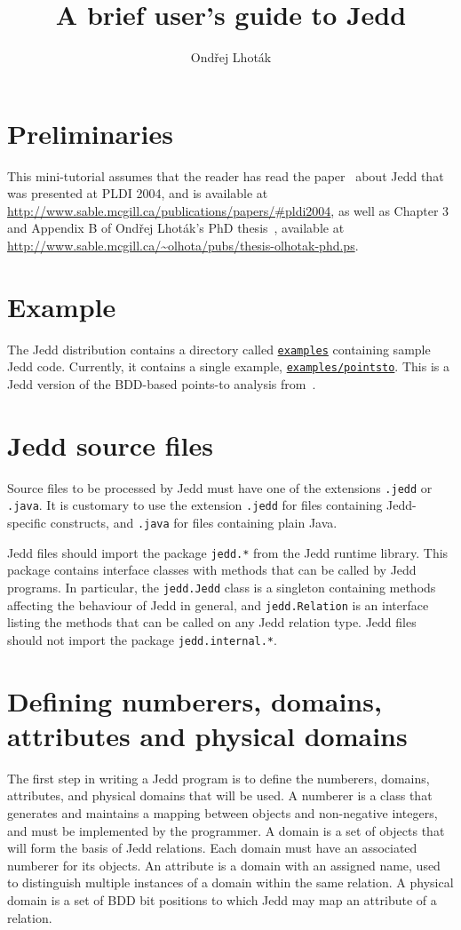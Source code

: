 \documentclass{article}
\title{A brief user's guide to Jedd}
\author{Ond\v{r}ej Lhot\'ak}
\begin{document}
\maketitle

\newcommand{\jeddpath}[1]{\href{https://svn.sable.mcgill.ca/soot/jedd/trunk/#1}{\nolinkurl{#1}}}

\section{Preliminaries}
This mini-tutorial assumes that the reader has
read the paper~\cite{Lhotak:2004:JBR} about Jedd that
was presented at PLDI 2004, and is available at
\url{http://www.sable.mcgill.ca/publications/papers/#pldi2004},
as well as Chapter 3 and Appendix B of Ond\v{r}ej Lhot\'ak's
PhD thesis~\cite{Lhotak:2005:PAU}, available at \url{http://www.sable.mcgill.ca/~olhota/pubs/thesis-olhotak-phd.ps}.

\section{Example}
The Jedd distribution contains a directory called \jeddpath{examples}
containing sample Jedd code. Currently, it contains a single example,
\jeddpath{examples/pointsto}. This is a Jedd version of the BDD-based points-to
analysis from~\cite{Berndl:2003:PAU}.

\section{Jedd source files}
Source files to be processed by Jedd must have one of the extensions
{\tt .jedd} or {\tt .java}. It is customary to use the extension {\tt .jedd}
for files containing Jedd-specific constructs, and {\tt .java} for files
containing plain Java.

Jedd files should import the package {\tt jedd.*} from the Jedd runtime
library. This package contains interface classes with methods that can
be called by Jedd programs. In particular, the {\tt jedd.Jedd} class
is a singleton containing methods affecting the behaviour of Jedd in
general, and {\tt jedd.Relation} is an interface listing the methods
that can be called on any Jedd relation type. Jedd files should not
import the package {\tt jedd.internal.*}.

\section{Defining numberers, domains, attributes and physical domains}
The first step in writing a Jedd program is to define the numberers,
domains, attributes, and physical domains that will be used. A numberer
is a class that generates and maintains a mapping between objects and
non-negative integers, and must be implemented by the programmer. A
domain is a set of objects that will form the basis of Jedd relations.
Each domain must have an associated numberer for its objects. An
attribute is a domain with an assigned name, used to distinguish
multiple instances of a domain within the same relation. A physical
domain is a set of BDD bit positions to which Jedd may map an attribute
of a relation.
\end{document}
